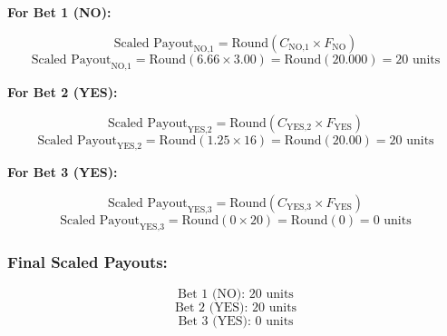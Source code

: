\documentclass{article}
\begin{document}
\textbf{For Bet 1 (NO):}

\[
\text{Scaled Payout}_{\text{NO,1}} = \text{Round}(C_{\text{NO,1}} \times F_{\text{NO}})
\]
\[
\text{Scaled Payout}_{\text{NO,1}} = \text{Round}(6.66 \times 3.00) = \text{Round}(20.000) = 20 \text{ units}
\]

\textbf{For Bet 2 (YES):}

\[
\text{Scaled Payout}_{\text{YES,2}} = \text{Round}(C_{\text{YES,2}} \times F_{\text{YES}})
\]
\[
\text{Scaled Payout}_{\text{YES,2}} = \text{Round}(1.25 \times 16) = \text{Round}(20.00) = 20 \text{ units}
\]

\textbf{For Bet 3 (YES):}

\[
\text{Scaled Payout}_{\text{YES,3}} = \text{Round}(C_{\text{YES,3}} \times F_{\text{YES}})
\]
\[
\text{Scaled Payout}_{\text{YES,3}} = \text{Round}(0 \times 20) = \text{Round}(0) = 0 \text{ units}
\]

\subsubsection*{Final Scaled Payouts:}
\[
\text{Bet 1 (NO): } 20 \text{ units}
\]
\[
\text{Bet 2 (YES): } 20 \text{ units}
\]
\[
\text{Bet 3 (YES): } 0 \text{ units}
\]

\begin{center}
\end{center}



\newpage
\end{document}
